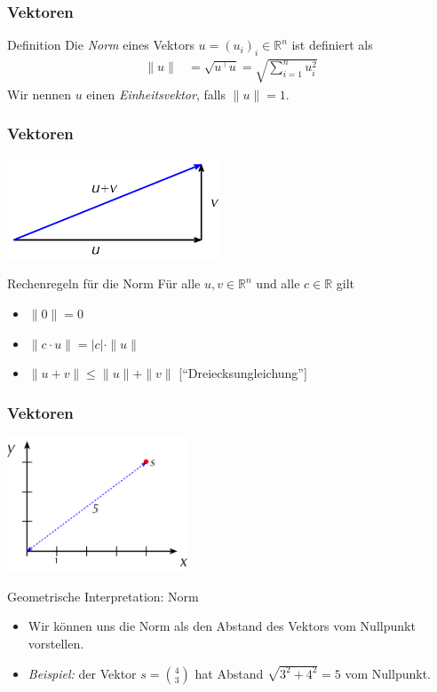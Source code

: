 \documentclass{beamer}
\renewcommand{\emph}[1]{{\textcolor{solarizedRed}{\itshape #1}}}
\newcommand\RR{\mathbb R}
\newcommand{\trans}{\top}
\renewcommand{\oe}{\"o}
\newcommand{\ue}{\"u}
\newcommand{\mytitle}{Vektoren}
\begin{document}
\begin{frame}\frametitle{\mytitle}
	\begin{block}{Definition}
		Die \emph{Norm} eines Vektors $u=(u_i)_i\in\RR^n$ ist definiert als
		\begin{align*}
			\|u\|&=\sqrt{u^\trans u}=\sqrt{\sum_{i=1}^nu_i^2}
		\end{align*}
		Wir nennen $u$ einen \emph{Einheitsvektor}, falls $\|u\|=1$.
	\end{block}
\end{frame}

\begin{frame}\frametitle{\mytitle}
	\hfill\includegraphics[height=30mm]{pics/triangleineq.pdf}
	\begin{block}{Rechenregeln f\ue r die Norm}
		F\ue r alle $u,v\in\RR^n$ und alle $c\in\RR$ gilt
	\begin{itemize}
		\item $\|0\|=0$
		\item $\|c\cdot u\|=|c|\cdot\|u\|$
		\item $\|u+v\|\leq\|u\|+\|v\|$ \hfill[``Dreiecksungleichung'']
	\end{itemize}
	\end{block}
\end{frame}

\begin{frame}\frametitle{\mytitle}
	\hfill\includegraphics[height=40mm]{pics/vectornorm.pdf}
	\begin{block}{Geometrische Interpretation: Norm}
	\begin{itemize}
		\item Wir k\oe nnen uns die Norm als den Abstand des Vektors vom Nullpunkt vorstellen.
		\item \emph{Beispiel:} der Vektor $s=\binom 43$ hat Abstand $\sqrt{3^2+4^2}=5$ vom Nullpunkt.
	\end{itemize}
	\end{block}
\end{frame}
\end{document}
